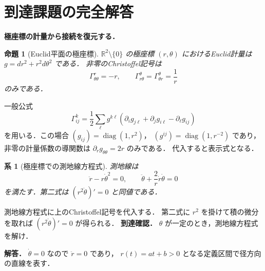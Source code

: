 \documentclass[a5paper,10pt,onecolumn]{jsarticle}
\makeatletter
\theoremstyle{mathnotetheorem}
\newtheorem{proposition}[theorem]{命題}
\newtheorem{corollary}[theorem]{系}
\renewcommand{\proofname}{証明}
\renewenvironment{proof}[1][\proofname]{%
  \par\pushQED{\qed}\normalfont\topsep4\p@\@plus2\p@\relax
  \trivlist\item[\hskip\labelsep\bfseries #1]\ignorespaces
}{\popQED\endtrivlist\@endpefalse}
\makeatother
\begin{document}
\section{到達課題の完全解答}
\noindent\textbf{極座標の計量から接続を復元する．}
\begin{proposition}[Euclid平面の極座標]
$\mathbb R^2\setminus\{0\}$ の極座標 $(r,\theta)$
におけるEuclid計量は
$g=dr^2+r^2d\theta^2$ である．
非零のChristoffel記号は
\[
\Gamma^r_{\theta\theta}=-r,\qquad
\Gamma^\theta_{r\theta}
=\Gamma^\theta_{\theta r}=\frac1r
\]
のみである．
\end{proposition}
\begin{proof}
一般公式
\[
\Gamma^k_{ij}
=\frac12\sum_\ell g^{k\ell}
(\partial_i g_{j\ell}+\partial_j g_{i\ell}
-\partial_\ell g_{ij})
\]
を用いる．この場合
$(g_{ij})=\operatorname{diag}(1,r^2)$，
$(g^{ij})=\operatorname{diag}(1,r^{-2})$ であり，
非零の計量係数の導関数は
$\partial_r g_{\theta\theta}=2r$ のみである．
代入すると表示式となる．
\end{proof}
\begin{corollary}[極座標での測地線方程式]
測地線は
\[
\ddot r-r\dot\theta^2=0,\qquad
\ddot\theta+\frac2r\dot r\dot\theta=0
\]
を満たす．第二式は
$(r^2\dot\theta)'=0$ と同値である．
\end{corollary}
\begin{proof}
測地線方程式に上のChristoffel記号を代入する．
第二式に $r^2$ を掛けて積の微分を取れば
$(r^2\dot\theta)'=0$ が得られる．
\end{proof}
\noindent\textbf{到達確認．}
$\theta$ が一定のとき，測地線方程式を解け．
\par\noindent\textbf{解答．}
$\dot\theta=0$ なので $\ddot r=0$ であり，
$r(t)=at+b>0$ となる定義区間で径方向の直線を表す．
\end{document}
